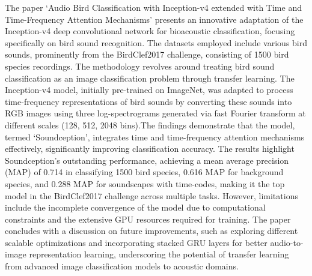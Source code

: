 The paper `Audio Bird Classification with Inception-v4 extended with Time and
Time-Frequency Attention Mechanisms' presents an innovative adaptation of the
Inception-v4 deep convolutional network for bioacoustic classification,
focusing specifically on bird sound recognition. The datasets employed include
various bird sounds, prominently from the BirdClef2017 challenge, consisting of
1500 bird species recordings. The methodology revolves around treating bird
sound classification as an image classification problem through transfer
learning. The Inception-v4 model, initially pre-trained on ImageNet, was
adapted to process time-frequency representations of bird sounds by converting
these sounds into RGB images using three log-spectrograms generated via fast
Fourier transform at different scales (128, 512, 2048 bins).The findings
demonstrate that the model,
termed `Soundception', integrates time and time-frequency attention mechanisms
effectively, significantly improving classification accuracy. The results
highlight Soundception's outstanding performance, achieving a mean average
precision (MAP) of 0.714 in classifying 1500 bird species, 0.616 MAP for
background species, and 0.288 MAP for soundscapes with time-codes, making it
the top model in the BirdClef2017 challenge across multiple tasks. However,
limitations include the incomplete convergence of the model due to
computational constraints and the extensive GPU resources required for
training. The paper concludes with a discussion on future
improvements, such as exploring different scalable optimizations and
incorporating stacked GRU layers for better audio-to-image representation
learning, underscoring the potential of transfer learning from advanced image
classification models to acoustic domains.\cite{sevilla2017audio}\\

